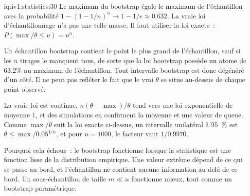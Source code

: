 \begin{solution}{iq:iv1:statistics:30}
Le maximum du bootstrap égale le maximum de l'échantillon avec la probabilité $1 - (1 - 1/n)^n \to 1 - 1/e \approx 0.632$. La vraie loi d'échantillonnage n'a pas une telle masse. Il faut utiliser la loi exacte~: $P(\max/\theta \le u) = u^n$.

Un échantillon bootstrap contient le point le plus grand de l'échantillon, sauf si les $n$ tirages le manquent tous, de sorte que la loi bootstrap possède un atome de $63.2\%$ au maximum de l'échantillon. Tout intervalle bootstrap est donc dégénéré d'un côté. Il ne peut pas refléter le fait que le vrai $\theta$ se situe au-dessus de chaque point observé.

La vraie loi est continue. $n(\theta - \max)/\theta$ tend vers une loi exponentielle de moyenne 1, et des simulations en confirment la moyenne et une valeur de queue. Comme $\max/\theta$ suit la loi exacte ci-dessus, un intervalle unilatéral à 95~\% est $\theta \le \max/0.05^{1/n}$, et pour $n = 1000$, le facteur vaut $1/0.9970$.

Pourquoi cela échoue~: le bootstrap fonctionne lorsque la statistique est une fonction lisse de la distribution empirique. Une valeur extrême dépend de ce qui se passe au bord, et l'échantillon ne contient aucune information au-delà de ce bord. Un sous-échantillon de taille $m \ll n$ fonctionne mieux, tout comme un bootstrap paramétrique.

\end{solution}

